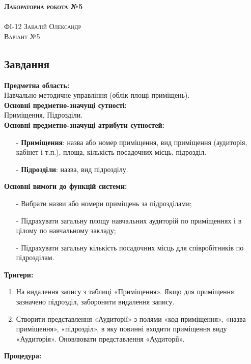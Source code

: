 \documentclass[a4paper,12pt]{article}
\begin{document}
	
	\begin{center}
		{\Large \bfseries \textsc{Лабораторна робота №5}}\\
		\hrulefill\\
		\Large \textsc{ФІ-12 Завалій Олександр\\ Варіант №5}
	\end{center}
	\begin{center}
		\section*{\bfseries{Завдання}}
	\end{center} 
	\textbf{Предметна область:} \\
	Навчально-методичне управління (облік площі приміщень). \\
	\textbf{Основні предметно-значущі сутності:} \\
	Приміщення, Підрозділи. \\
	\textbf{Основні предметно-значущі атрибути сутностей:}
	\begin{enumerate}
		\item[-] \textbf{Приміщення}: назва або номер приміщення, вид приміщення (аудиторія, кабінет і т.п.), площа, кількість посадочних місць, підрозділ. 
		\item[-] \textbf{Підрозділи}: назва, вид підрозділу.
	\end{enumerate}
	\textbf{Основні вимоги до функцій системи:}
	\begin{enumerate}
		\item[-] Вибрати назви або номери приміщень за підрозділами;
		\item[-] Підрахувати загальну площу навчальних аудиторій по приміщеннях і в цілому по навчальному закладу;
		\item[-] Підрахувати загальну кількість посадочних місць для співробітників по підрозділам.
	\end{enumerate}
	\textbf{Тригери:}
	\begin{enumerate}
		\item На видалення запису з таблиці «Приміщення». Якщо для приміщення зазначено підрозділ, заборонити видалення запису.
		\item Створити представлення «Аудиторії» з полями «код приміщення», «назва приміщення», «підрозділ», в яку повинні входити приміщення виду «Аудиторія». Оновлювати представлення «Аудиторії».
	\end{enumerate}
	\textbf{Процедура:}\\
\end{document}
